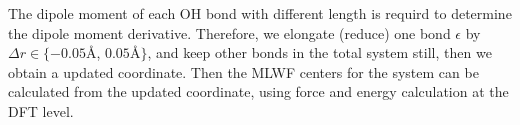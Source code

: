 %        
%
The dipole moment of each OH bond with different length is requird to determine the dipole moment derivative. 
Therefore, we elongate (reduce) one bond ${\epsilon}$ by $\Delta r \in \{-0.05 $\AA, $0.05 $\AA $\}$, and keep other 
bonds in the total system still, then we obtain a updated coordinate.
Then the MLWF centers for the system can be calculated from the updated coordinate, using force and energy calculation at the DFT level.

